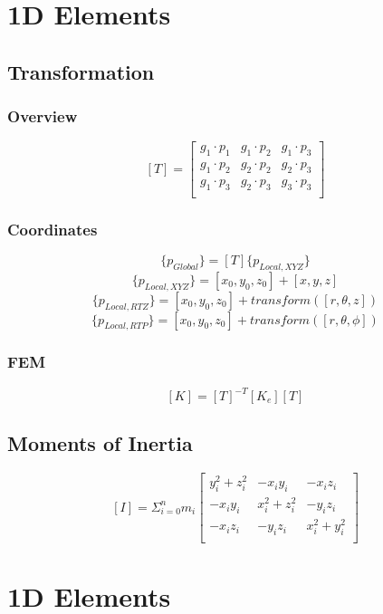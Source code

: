 \documentclass[a4paper,12pt]{article}
\begin{document}
\section{1D Elements}
   \subsection{Transformation}
     \subsubsection{Overview}
     \[ [T] = 
            \left[ \begin{array}{ccc}
               g_1 \cdot p_1 & g_1 \cdot p_2 & g_1 \cdot p_3 \\
               g_1 \cdot p_2 & g_2 \cdot p_2 & g_2 \cdot p_3 \\
               g_1 \cdot p_3 & g_2 \cdot p_3 & g_3 \cdot p_3 \\
            \end{array}\right]\]
     \subsubsection{Coordinates}
      \[ \{p_{Global}\}  = [T]\{p_{Local,XYZ}\} \]
      \[ \{p_{Local,XYZ}\} = [x_0,y_0,z_0]+[x,y,z] \]
      \[ \{p_{Local,RTZ}\} = [x_0,y_0,z_0]+transform([r,\theta,   z]) \]
      \[ \{p_{Local,RTP}\} = [x_0,y_0,z_0]+transform([r,\theta,\phi]) \]

     \subsubsection{FEM}

      \[ [K] = [T]^{-T} [K_e] [T]  \]

  \subsection{Moments of Inertia}
    \[ [I] = \Sigma_{i=0}^n m_i \left[ \begin{array}{cccc}
               y_i^2+z_i^2 & -x_i y_i    & -x_i z_i  \\
               -x_i y_i    & x_i^2+z_i^2 & -y_i z_i  \\
               -x_i z_i    & -y_i z_i    & x_i^2+y_i^2  \\
            \end{array}\right]\]


\section{1D Elements}
\end{document}
